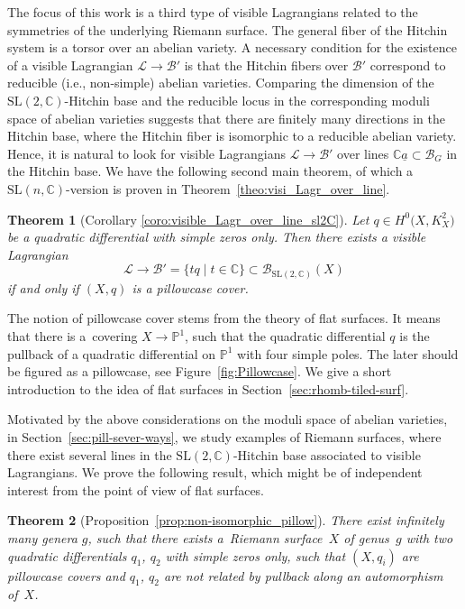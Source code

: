 \documentclass[10pt,a4paper]{amsart}
\numberwithin{equation}{section}
\newtheorem{theo}{Theorem}[section]
\theoremstyle{definition}
\renewcommand{\to}{\rightarrow}
\newcommand{\calB}{\mathcal{B}}
\newcommand{\calL}{\mathcal{L}}
\newcommand{\CC}{\mathbb{C}}
\newcommand{\PP}{\mathbb{P}}
\newcommand{\SL}{\mathrm{SL}}
\begin{document}
The focus of this work is a third type of visible Lagrangians related to the symmetries of the underlying Riemann surface. The general fiber of the Hitchin system is a torsor over an abelian variety. A necessary condition for the existence of a visible Lagrangian $\calL \to \calB'$ is that the Hitchin fibers over $\calB'$ correspond to reducible (i.e., non-simple) abelian varieties. Comparing the dimension of the $\SL(2,\CC)$-Hitchin base and the reducible locus in the corresponding moduli space of abelian varieties suggests that there are finitely many directions in the Hitchin base, where the Hitchin fiber is isomorphic to a reducible abelian variety. Hence, it is natural to look for visible Lagrangians $\calL \to \calB'$ over lines $\CC \underline{a} \subset \calB_G$ in the Hitchin base. We have the following second main theorem, of which a $\SL(n,\CC)$-version is proven in Theorem~\ref{theo:visi_Lagr_over_line}.

\begin{theo}[Corollary \ref{coro:visible_Lagr_over_line_sl2C}]\label{theo:intro:1-dim_examples}
 Let $q \in H^0\bigl(X,K_X^2\bigr)$ be a quadratic differential with simple zeros only. Then there exists a visible Lagrangian
 \[ \calL \to \calB'=\{t q \mid t \in \CC\} \subset \calB_{\SL(2,\CC)}(X)
 \]
 if and only if $(X,q)$ is a pillowcase cover.
\end{theo}

The notion of pillowcase cover stems from the theory of flat surfaces. It means that there is a~covering $X \to \PP^1$, such that the quadratic differential $q$ is the pullback of a quadratic differential on $\PP^1$ with four simple poles. The later should be figured as a pillowcase, see Figure~\ref{fig:Pillowcase}. We give a short introduction to the idea of flat surfaces in Section~\ref{sec:rhomb-tiled-surf}.

Motivated by the above considerations on the moduli space of abelian varieties, in Section~\ref{sec:pill-sever-ways}, we study examples of Riemann surfaces, where there exist several lines in the $\SL(2,\CC)$-Hitchin base associated to visible Lagrangians. We prove the following result, which might be of independent interest from the point of view of flat surfaces.

\begin{theo}[{Proposition~\ref{prop:non-isomorphic_pillow}}]\label{theo:intro_3}
 There exist infinitely many genera $g$, such that there exists a~Riemann surface~$X$ of genus~$g$ with two quadratic differentials $q_1$, $q_2$ with simple zeros only, such that $(X,q_i)$ are pillowcase covers and $q_1$, $q_2$ are not related by pullback along an automorphism of~$X$.
\end{theo}
\end{document}
